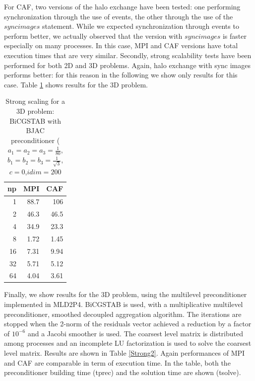 \documentclass{IOS-Book-Article}
\begin{document}
For CAF, two versions of the halo exchange have been tested: one performing synchronization through the use of events, the other through the use of the $sync images$ statement. While we expected synchronization through events to perform better, we actually observed that the version with $sync images$ is faster especially on many processes. In this case, MPI and CAF versions have total execution times that are very similar. 
Secondly, strong scalability tests have been performed for both 2D and 3D problems. Again, halo exchange with sync images performs better: for this reason in the following we show only results for this case. Table \ref{strong} shows results for the 3D problem.
 
\begin{table}[]
\centering
\caption{Strong scaling for a 3D problem: BiCGSTAB with BJAC preconditioner ($a_1=a_2=a_3=\frac{1}{80}$, $b_1=b_2=b_3=\frac{1}{\sqrt{3}}$, $c=0$,$idim=200$}
\label{strong}
\begin{tabular}{@{}rrr@{}}
\toprule
\multicolumn{1}{c}{np} & \multicolumn{1}{c}{MPI} & \multicolumn{1}{c}{CAF} \\ \midrule
1                      & 88.7                  & 106                  \\
2                      & 46.3                  & 46.5                  \\
4                      & 34.9                  & 23.3                  \\
8                      & 1.72                  & 1.45                  \\
16                     & 7.31                  & 9.94                  \\
32                     & 5.71                  & 5.12                  \\
64                     & 4.04                  & 3.61                  \\ \bottomrule
\end{tabular}
\end{table} 

Finally, we show results for the 3D problem, using the multilevel preconditioner implemented in MLD2P4. BiCGSTAB is used, with a multiplicative multilevel preconditioner, smoothed decoupled aggregation algorithm. The iterations are stopped when the 2-norm of the residuals vector achieved a reduction by a factor of $10^{-6}$ and a Jacobi smoother is used. The coarsest level matrix is distributed among processes and an incomplete LU factorization is used to solve the coarsest level matrix. Results are shown in Table \ref{Strong2}. Again performances of MPI and CAF are comparable in term of execution time. In the table, both the preconditioner building time (tprec) and the solution time are shown (tsolve). 
\end{document}
